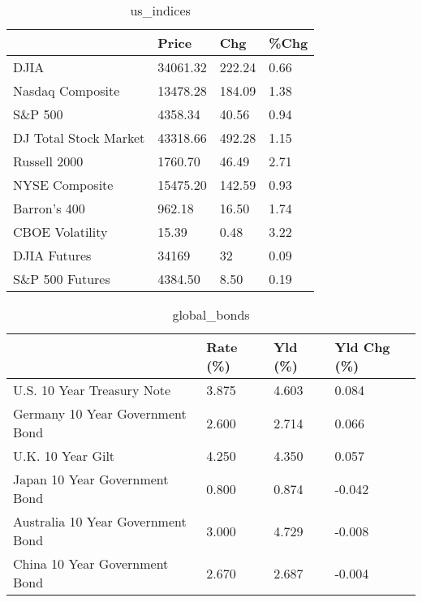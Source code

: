 \documentclass{article}%
\begin{document}
%


\begin{table}[htbp]%
\caption{us\_indices}%
\centering%
\begin{adjustbox}{width=1\textwidth}%
\begin{tabular}{llll}
\toprule
                      &    Price &    Chg & \%Chg \\
\midrule
                 DJIA & 34061.32 & 222.24 & 0.66 \\
     Nasdaq Composite & 13478.28 & 184.09 & 1.38 \\
              S\&P 500 &  4358.34 &  40.56 & 0.94 \\
DJ Total Stock Market & 43318.66 & 492.28 & 1.15 \\
         Russell 2000 &  1760.70 &  46.49 & 2.71 \\
       NYSE Composite & 15475.20 & 142.59 & 0.93 \\
         Barron's 400 &   962.18 &  16.50 & 1.74 \\
      CBOE Volatility &    15.39 &   0.48 & 3.22 \\
         DJIA Futures &    34169 &     32 & 0.09 \\
      S\&P 500 Futures &  4384.50 &   8.50 & 0.19 \\
\bottomrule
\end{tabular}
%
\end{adjustbox}%
\end{table}

%


\begin{table}[htbp]%
\caption{global\_bonds}%
\centering%
\begin{adjustbox}{width=1\textwidth}%
\begin{tabular}{llll}
\toprule
                                  & Rate (\%) & Yld (\%) & Yld Chg (\%) \\
\midrule
       U.S. 10 Year Treasury Note &    3.875 &   4.603 &       0.084 \\
  Germany 10 Year Government Bond &    2.600 &   2.714 &       0.066 \\
                U.K. 10 Year Gilt &    4.250 &   4.350 &       0.057 \\
    Japan 10 Year Government Bond &    0.800 &   0.874 &      -0.042 \\
Australia 10 Year Government Bond &    3.000 &   4.729 &      -0.008 \\
    China 10 Year Government Bond &    2.670 &   2.687 &      -0.004 \\
\bottomrule
\end{tabular}
%
\end{adjustbox}%
\end{table}
\end{document}
